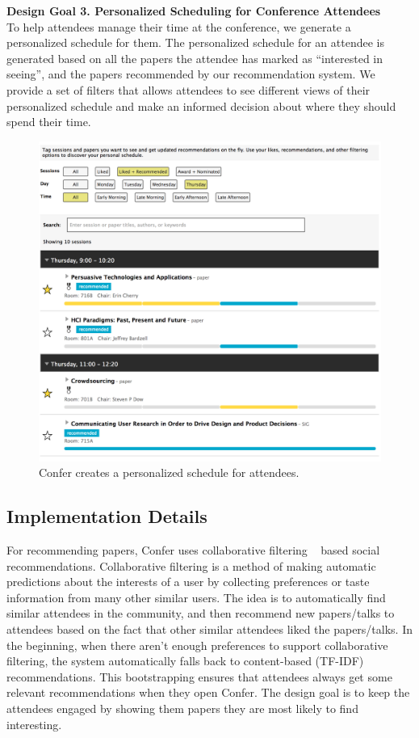 \documentclass{sigchi}
\begin{document}
\textbf{Design Goal 3. Personalized Scheduling for Conference Attendees}\\
To help attendees manage their time at the conference, we generate a personalized schedule for them. The personalized schedule for an attendee is generated based on all the papers the attendee has marked as ``interested in seeing'', and the papers recommended by our recommendation system. We provide a set of filters that allows attendees to see different views of their personalized schedule and make an informed decision about where they should spend their time.

\begin{figure}[!h]
\centering
\includegraphics[width=0.95\columnwidth]{confer-personal-schedule.png}
\caption{Confer creates a personalized schedule for attendees.}
\label{confer-personal-schedule}
\end{figure}

\subsection{Implementation Details}
For recommending papers, Confer uses collaborative filtering ~\cite{CollaborativeFiltering} based social recommendations. Collaborative filtering is a method of making automatic predictions about the interests of a user by collecting preferences or taste information from many other similar users. The idea is to automatically find similar attendees in the community, and then recommend new papers/talks to attendees based on the fact that other similar attendees liked the papers/talks. In the beginning, when there aren't enough preferences to support collaborative filtering, the system automatically falls back to content-based (TF-IDF) recommendations. This bootstrapping ensures that attendees always get some relevant recommendations when they open Confer. The design goal is to keep the attendees engaged by showing them papers they are most likely to find interesting.
\end{document}
